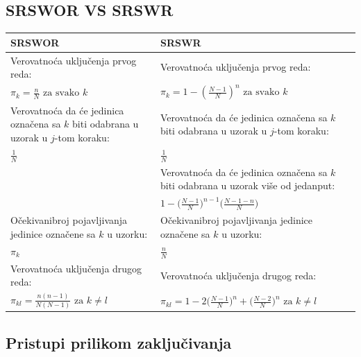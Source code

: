\documentclass[10pt,a4paper,]{article}
\begin{document}
\subsection{SRSWOR VS SRSWR}
\begin{center}
\begin{tabular}{|p{6cm}|p{6cm}|}
\hline
SRSWOR & SRSWR \\
\hline
Verovatnoća uključenja prvog reda: 
&
Verovatnoća uključenja prvog reda: \\
$ \pi_k = \frac{n}{N} \text{ za svako } k$
&
$ \pi_k = 1 - (\frac{N-1}{N})^n \text{ za svako } k $
\\
\hline

Verovatnoća da će jedinica označena sa $k$ biti odabrana u uzorak u $j$-tom koraku:
&
Verovatnoća da će jedinica označena sa $k$ biti 
odabrana u uzorak u $j$-tom koraku:
\\

$\frac{1}{N}$
&
$\frac{1}{N}$\\
\hline

&
Verovatnoća da će jedinica označena sa $k$ biti odabrana u uzorak više od jedanput:\\

&
$1 - \big(\frac{N-1}{N}\big)^{n-1}\big(\frac{N-1-n}{N}\big)$ \\
\hline

Očekivanibroj pojavljivanja jedinice označene sa $k$ u uzorku:
&
Očekivanibroj pojavljivanja jedinice označene sa $k$ u uzorku: \\
$\pi_k$
&
$\frac{n}{N}$ \\
\hline
Verovatnoća uključenja drugog reda:
&
Verovatnoća uključenja drugog reda: \\

$\pi_{kl} = \frac{n(n-1)}{N(N-1)} \text{ za } k \neq l$
&
$\pi_{kl} = 1 - 2\big(\frac{N-1}{N}\big)^n 
+ \big(\frac{N-2}{N}\big)^n \text{ za } k \neq l$\\
\hline

\end{tabular}
\end{center}

\subsection{Pristupi prilikom zaključivanja}
\end{document}
